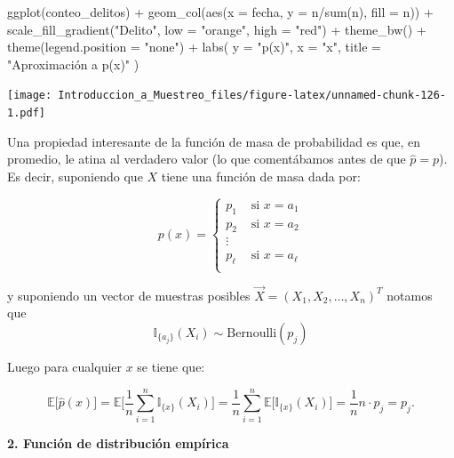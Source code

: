\documentclass[
]{book}
\newenvironment{Shaded}{\begin{snugshade}}{\end{snugshade}}
\newcommand{\AttributeTok}[1]{\textcolor[rgb]{0.77,0.63,0.00}{#1}}
\newcommand{\FunctionTok}[1]{\textcolor[rgb]{0.00,0.00,0.00}{#1}}
\newcommand{\NormalTok}[1]{#1}
\newcommand{\SpecialCharTok}[1]{\textcolor[rgb]{0.00,0.00,0.00}{#1}}
\newcommand{\StringTok}[1]{\textcolor[rgb]{0.31,0.60,0.02}{#1}}
\begin{document}
\begin{Shaded}
\begin{Highlighting}[]
\FunctionTok{ggplot}\NormalTok{(conteo\_delitos) }\SpecialCharTok{+}
  \FunctionTok{geom\_col}\NormalTok{(}\FunctionTok{aes}\NormalTok{(}\AttributeTok{x =}\NormalTok{ fecha, }\AttributeTok{y =}\NormalTok{ n}\SpecialCharTok{/}\FunctionTok{sum}\NormalTok{(n), }\AttributeTok{fill =}\NormalTok{ n)) }\SpecialCharTok{+}
  \FunctionTok{scale\_fill\_gradient}\NormalTok{(}\StringTok{"Delito"}\NormalTok{, }\AttributeTok{low =} \StringTok{"orange"}\NormalTok{, }\AttributeTok{high =} \StringTok{"red"}\NormalTok{) }\SpecialCharTok{+}
  \FunctionTok{theme\_bw}\NormalTok{() }\SpecialCharTok{+}
  \FunctionTok{theme}\NormalTok{(}\AttributeTok{legend.position =} \StringTok{"none"}\NormalTok{) }\SpecialCharTok{+}
  \FunctionTok{labs}\NormalTok{(}
    \AttributeTok{y =} \StringTok{"p(x)"}\NormalTok{,}
    \AttributeTok{x =} \StringTok{"x"}\NormalTok{,}
    \AttributeTok{title =} \StringTok{"Aproximación a p(x)"}
\NormalTok{  )}
\end{Highlighting}
\end{Shaded}

\texttt{[image: Introduccion\_a\_Muestreo\_files/figure-latex/unnamed-chunk-126-1.pdf]}

Una propiedad interesante de la función de masa de probabilidad es que, en promedio, le atina al verdadero valor (lo que comentábamos antes de que \(\hat{p} = p\)). Es decir, suponiendo que \(X\) tiene una función de masa dada por:

\[
p(x) = \begin{cases}
p_1 & \text{ si } x = a_1 \\
p_2 & \text{ si } x = a_2 \\
\vdots \\
p_{\ell} & \text{ si } x = a_{\ell} \\
\end{cases}
\]

y suponiendo un vector de muestras posibles \(\vec{X} = (X_1, X_2, \dots, X_n)^T\) notamos que
\[
\mathbb{I}_{\{ a_j \}}(X_i) \sim \text{Bernoulli} (p_j)
\]

Luego para cualquier \(x\) se tiene que:

\[
\mathbb{E}\big[ \hat{p}(x)\big] = \mathbb{E}\bigg[ \dfrac{1}{n}\sum\limits_{i=1}^{n} \mathbb{I}_{\{ x \}}(X_i)  \bigg] = 
 \dfrac{1}{n}\sum\limits_{i=1}^{n}\mathbb{E}\big[ \mathbb{I}_{\{ x \}}(X_i)  \big] = \frac{1}{n} n \cdot p_j = p_j.
\]

\textbf{2. Función de distribución empírica}
\end{document}
